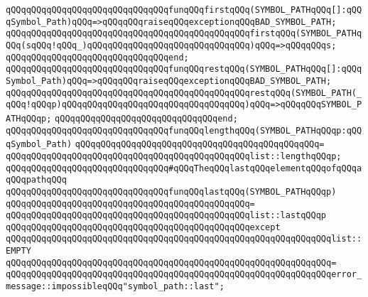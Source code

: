 \newline
\verb|qQQqqQQqqQQqqQQqqQQqqQQqqQQqqQQqfunqQQqfirstqQQq(SYMBOL_PATHqQQq[]:qQQqSymbol_Path)qQQq=>qQQqqQQqraiseqQQqexceptionqQQqBAD_SYMBOL_PATH;|\newline
\verb|qQQqqQQqqQQqqQQqqQQqqQQqqQQqqQQqqQQqqQQqqQQqqQQqfirstqQQq(SYMBOL_PATHqQQq(sqQQq!qQQq_)qQQqqQQqqQQqqQQqqQQqqQQqqQQqqQQq)qQQq=>qQQqqQQqs;|\newline
\verb|qQQqqQQqqQQqqQQqqQQqqQQqqQQqqQQqend;|\newline
\newline
\verb|qQQqqQQqqQQqqQQqqQQqqQQqqQQqqQQqfunqQQqrestqQQq(SYMBOL_PATHqQQq[]:qQQqSymbol_Path)qQQq=>qQQqqQQqraiseqQQqexceptionqQQqBAD_SYMBOL_PATH;|\newline
\verb|qQQqqQQqqQQqqQQqqQQqqQQqqQQqqQQqqQQqqQQqqQQqqQQqrestqQQq(SYMBOL_PATH(_qQQq!qQQqp)qQQqqQQqqQQqqQQqqQQqqQQqqQQqqQQqqQQq)qQQq=>qQQqqQQqSYMBOL_PATHqQQqp;|\newline
\verb|qQQqqQQqqQQqqQQqqQQqqQQqqQQqqQQqend;|\newline
\newline
\verb|qQQqqQQqqQQqqQQqqQQqqQQqqQQqqQQqfunqQQqlengthqQQq(SYMBOL_PATHqQQqp:qQQqSymbol_Path)|\newline
\verb|qQQqqQQqqQQqqQQqqQQqqQQqqQQqqQQqqQQqqQQqqQQqqQQq=|\newline
\verb|qQQqqQQqqQQqqQQqqQQqqQQqqQQqqQQqqQQqqQQqqQQqqQQqlist::lengthqQQqp;|\newline
\newline
\newline
\verb|qQQqqQQqqQQqqQQqqQQqqQQqqQQqqQQq#qQQqTheqQQqlastqQQqelementqQQqofqQQqaqQQqpathqQQq|\newline
\newline
\verb|qQQqqQQqqQQqqQQqqQQqqQQqqQQqqQQqfunqQQqlastqQQq(SYMBOL_PATHqQQqp)|\newline
\verb|qQQqqQQqqQQqqQQqqQQqqQQqqQQqqQQqqQQqqQQqqQQqqQQq=|\newline
\verb|qQQqqQQqqQQqqQQqqQQqqQQqqQQqqQQqqQQqqQQqqQQqqQQqlist::lastqQQqp|\newline
\verb|qQQqqQQqqQQqqQQqqQQqqQQqqQQqqQQqqQQqqQQqqQQqqQQqexcept|\newline
\verb|qQQqqQQqqQQqqQQqqQQqqQQqqQQqqQQqqQQqqQQqqQQqqQQqqQQqqQQqqQQqqQQqlist::EMPTY|\newline
\verb|qQQqqQQqqQQqqQQqqQQqqQQqqQQqqQQqqQQqqQQqqQQqqQQqqQQqqQQqqQQqqQQq=|\newline
\verb|qQQqqQQqqQQqqQQqqQQqqQQqqQQqqQQqqQQqqQQqqQQqqQQqqQQqqQQqqQQqqQQqerror_message::impossibleqQQq"symbol_path::last";|\newline
